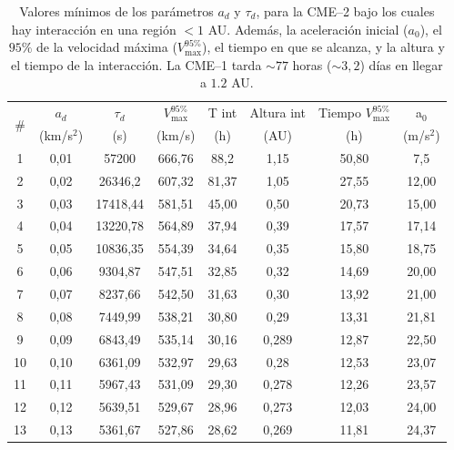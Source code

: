 \begin{table}[h]
    \centering
    \footnotesize
    \begin{threeparttable}
        \caption[Valores mínimos de los parámetros $a_d$ y $\tau_d$ para la CME--2 bajo los cuales hay interacción]{Valores mínimos de los parámetros $a_d$ y $\tau_d$, para la CME--2 bajo los cuales hay interacción en una región $<1$ AU. Además, la aceleración inicial ($a_0$), el $95\%$ de la velocidad máxima ($V_{\text{max}}^{95\%}$), el tiempo en que se alcanza, y la altura y el tiempo de la interacción. La CME--1 tarda $\sim 77$ horas ($\sim 3,2$) días en llegar a $1.2$ AU.}
        \label{tab:parametros_decaimiento}
        \begin{tabular}{@{}c c c c c c c c@{}}
            \toprule
            \multirow{2}{*}{\#} & $a_d$ & $\tau_d$ & $V_{\text{max}}^{95\%}$ & T int & Altura int & Tiempo $V_{\text{max}}^{95\%}$ & a$_0$ \\
             & (km/s$^2$) & (s) & (km/s) & (h) & (AU) & (h) & (m/s$^2$) \\
            \midrule
            1  & 0,01 & 57200 & 666,76 & 88,2 & 1,15  & 50,80 & 7,5\\
            2  & 0,02 & 26346,2 & 607,32 & 81,37  & 1,05  & 27,55 & 12,00\\
            3  & 0,03 & 17418,44 & 581,51  & 45,00  & 0,50  & 20,73 & 15,00\\
            4  & 0,04 & 13220,78 & 564,89  & 37,94  & 0,39  & 17,57 & 17,14\\
            5  & 0,05 & 10836,35 & 554,39 & 34,64  & 0,35  & 15,80 & 18,75\\
            6  & 0,06 & 9304,87  & 547,51 & 32,85 & 0,32  & 14,69 & 20,00\\
            7  & 0,07 & 8237,66  & 542,50 & 31,63 & 0,30  & 13,92 & 21,00\\
            8  & 0,08 & 7449,99  & 538,21 & 30,80 & 0,29  & 13,31 & 21,81\\
            9  & 0,09 & 6843,49  & 535,14 & 30,16 & 0,289 & 12,87 & 22,50\\
            10 & 0,10 & 6361,09  & 532,97 & 29,63 & 0,28  & 12,53 & 23,07\\
            11 & 0,11 & 5967,43  & 531,09 & 29,30 & 0,278  & 12,26 & 23,57\\
            12 & 0,12 & 5639,51  & 529,67 & 28,96 & 0,273 & 12,03 & 24,00\\
            13 & 0,13 & 5361,67  & 527,86 & 28,62 & 0,269 & 11,81 & 24,37\\

\end{tabular}
\end{threeparttable}
\end{table}
